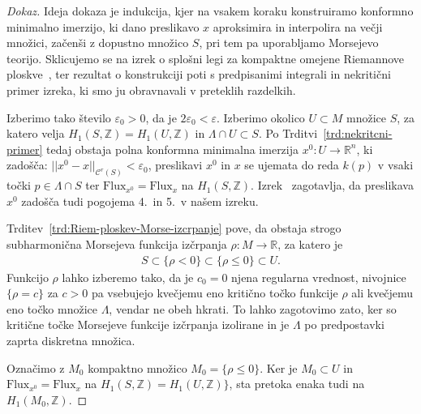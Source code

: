 \documentclass[12pt,a4paper,twoside]{article}
\theoremstyle{definition} %
\newenvironment{dokaz}[1][Dokaz]{\begin{proof}[#1]}{\end{proof}}
\theoremstyle{plain} %
\numberwithin{equation}{section}  %
\begin{document}
\begin{dokaz}
Ideja dokaza je indukcija, kjer na vsakem koraku konstruiramo konformno minimalno imerzijo, ki dano preslikavo $x$ aproksimira in interpolira na večji množici, začenši z dopustno množico $S$, pri tem pa uporabljamo Morsejevo teorijo. 
Sklicujemo se na izrek o splošni legi za kompaktne omejene Riemannove ploskve~\cite[Theorem~3.4.1]{alarcon2021minimal},
ter rezultat o konstrukciji poti s predpisanimi integrali in nekritični primer izreka, ki smo ju obravnavali v preteklih razdelkih.

Izberimo tako število $\varepsilon_0 > 0$, da je $2 \varepsilon_0 < \varepsilon$.
Izberimo okolico $U \subset M$ množice $S$, za katero velja $H_{1}(S, \mathbb{Z}) = H_{1}(U, \mathbb{Z})$ in $\Lambda \cap U \subset S$.
Po Trditvi~\ref{trd:nekritcni-primer} tedaj obstaja polna konformna minimalna imerzija $x^{0} \colon U \to \mathbb{R}^{n}$, ki zadošča:
$ ||x^{0}-x||_{\mathcal{C}^{r}(S)} < \varepsilon_0$, preslikavi $x^{0}$ in $x$ se ujemata do reda $k(p)$ v vsaki točki $p \in \Lambda \cap S$ ter $ \text{Flux}_{x^{0}} = \text{Flux}_{x}$ na $H_{1}(S, \mathbb{Z})$.
Izrek~\cite[Theorem~3.4.1~(b),(c)]{alarcon2021minimal}
zagotavlja, da preslikava $x^{0}$ zadošča tudi pogojema 4.~in 5.~v našem izreku.

Trditev~\ref{trd:Riem-ploskev-Morse-izcrpanje} pove, da obstaja strogo subharmonična Morsejeva funkcija izčrpanja $\rho \colon M \to \mathbb{R}$, za katero je
\begin{gather*}
S \subset \{ \rho < 0 \} \subset \{ \rho \leq 0 \} \subset U.
\end{gather*}
Funkcijo $\rho$ lahko izberemo tako, da je $c_0 = 0$ njena regularna vrednost, nivojnice $\{ \rho = c \}$ za $c>0$ pa vsebujejo kvečjemu eno kritično točko funkcije $\rho$ ali kvečjemu eno točko množice $\Lambda$, vendar ne obeh hkrati. To lahko zagotovimo zato, ker so kritične točke Morsejeve funkcije izčrpanja izolirane in je $\Lambda$ po predpostavki zaprta diskretna množica.

Označimo z $M_{0}$ kompaktno množico $M_{0} = \{ \rho \leq 0 \}$.
Ker je $M_{0} \subset U$ in $\text{Flux}_{x^{0}} = \text{Flux}_{x}$ na $H_{1}(S, \mathbb{Z}) = H_{1}(U, \mathbb{Z}) \}$, sta pretoka enaka tudi na $H_{1}(M_{0}, \mathbb{Z})$.


\end{dokaz}
\end{document}
